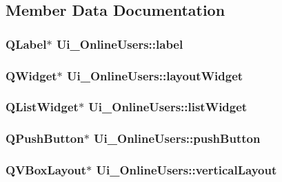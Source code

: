 \subsection{Member Data Documentation}
\hypertarget{classUi__OnlineUsers_a19669e58b217ccc41868c3ad9ee0415b}{
\subsubsection[{label}]{\setlength{\rightskip}{0pt plus 5cm}Q\-Label$\ast$ Ui\-\_\-\-Online\-Users\-::label}}\label{classUi__OnlineUsers_a19669e58b217ccc41868c3ad9ee0415b}
\hypertarget{classUi__OnlineUsers_a1ae3a7c0c8ef39ecb1de05e649d01e93}{
\subsubsection[{layout\-Widget}]{\setlength{\rightskip}{0pt plus 5cm}Q\-Widget$\ast$ Ui\-\_\-\-Online\-Users\-::layout\-Widget}}\label{classUi__OnlineUsers_a1ae3a7c0c8ef39ecb1de05e649d01e93}
\hypertarget{classUi__OnlineUsers_a9a039e91b6f44b0b42dc465fd4c5db18}{
\subsubsection[{list\-Widget}]{\setlength{\rightskip}{0pt plus 5cm}Q\-List\-Widget$\ast$ Ui\-\_\-\-Online\-Users\-::list\-Widget}}\label{classUi__OnlineUsers_a9a039e91b6f44b0b42dc465fd4c5db18}
\hypertarget{classUi__OnlineUsers_a87fd92269104f4155834b5ea8701dfa2}{
\subsubsection[{push\-Button}]{\setlength{\rightskip}{0pt plus 5cm}Q\-Push\-Button$\ast$ Ui\-\_\-\-Online\-Users\-::push\-Button}}\label{classUi__OnlineUsers_a87fd92269104f4155834b5ea8701dfa2}
\hypertarget{classUi__OnlineUsers_aec3870a3ac2e7aa907a2984775ce2370}{
\subsubsection[{vertical\-Layout}]{\setlength{\rightskip}{0pt plus 5cm}Q\-V\-Box\-Layout$\ast$ Ui\-\_\-\-Online\-Users\-::vertical\-Layout}}\label{classUi__OnlineUsers_aec3870a3ac2e7aa907a2984775ce2370}
